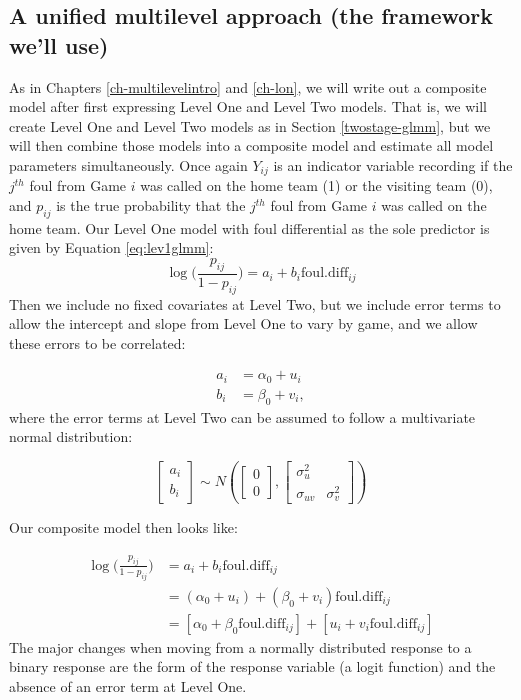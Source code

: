 \documentclass[
]{krantz}
\begin{document}
\hypertarget{unified-glmm}{%
\subsection{A unified multilevel approach (the framework we'll use)}\label{unified-glmm}}

As in Chapters \ref{ch-multilevelintro} and \ref{ch-lon}, we will write out a composite model after first expressing Level One and Level Two models. That is, we will create Level One and Level Two models as in Section \ref{twostage-glmm}, but we will then combine those models into a composite model and estimate all model parameters simultaneously. Once again \(Y_{ij}\) is an indicator variable recording if the \(j^{th}\) foul from Game \(i\) was called on the home team (1) or the visiting team (0), and \(p_{ij}\) is the true probability that the \(j^{th}\) foul from Game \(i\) was called on the home team. Our Level One model with foul differential as the sole predictor is given by Equation \eqref{eq:lev1glmm}:
\[ \log\bigg(\frac{p_{ij}}{1-p_{ij}}\bigg)=a_i+b_i\mathrm{foul.diff}_{ij} \]
Then we include no fixed covariates at Level Two, but we include error terms to allow the intercept and slope from Level One to vary by game, and we allow these errors to be correlated:

\begin{align*}
a_i & = \alpha_{0}+u_i \\
b_i & = \beta_{0}+v_i,
\end{align*}
where the error terms at Level Two can be assumed to follow a multivariate normal distribution:

\[ \left[ \begin{array}{c}
            a_i \\ b_i
          \end{array}  \right] \sim N \left( \left[
          \begin{array}{c}
            0 \\ 0
          \end{array} \right], \left[
          \begin{array}{cc}
            \sigma_{u}^{2} & \\
            \sigma_{uv} & \sigma_{v}^{2}
          \end{array} \right] \right) \]

Our composite model then looks like:

\begin{align*}
\log\bigg(\frac{p_{ij}}{1-p_{ij}}\bigg) & = a_i+b_i\mathrm{foul.diff}_{ij} \\
 & = (\alpha_{0}+u_i) + (\beta_{0}+v_i)\mathrm{foul.diff}_{ij} \\
 & = [\alpha_{0}+\beta_{0}\mathrm{foul.diff}_{ij}]+[u_i+v_i\mathrm{foul.diff}_{ij}]
\end{align*}
The major changes when moving from a normally distributed response to a binary response are the form of the response variable (a logit function) and the absence of an error term at Level One.
\end{document}
